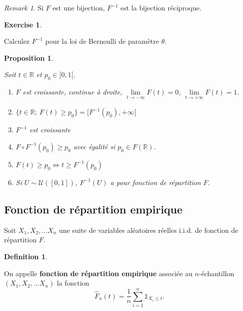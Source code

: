 \documentclass[
]{book}
\providecommand{\tightlist}{%
  \setlength{\itemsep}{0pt}\setlength{\parskip}{0pt}}
\newtheorem{proposition}{Proposition}[chapter]
\theoremstyle{definition}
\newtheorem{definition}{Definition}[chapter]
\theoremstyle{definition}
\theoremstyle{definition}
\newtheorem{exercise}{Exercise}[chapter]
\theoremstyle{definition}
\theoremstyle{remark}
\newtheorem*{remark}{Remark}
\begin{document}
\begin{remark}

Si \(F\) est une bijection, \(F^{-1}\) est la bijection réciproque.

\end{remark}

\begin{exercise}
\protect\hypertarget{exr:unlabeled-div-12}{}\label{exr:unlabeled-div-12}

Calculez \(F^{-1}\) pour la loi de Bernoulli de paramètre \(\theta\).

\end{exercise}

\begin{proposition}
\protect\hypertarget{prp:unlabeled-div-13}{}\label{prp:unlabeled-div-13}

Soit \(t\in\mathbb{R}\) et \(p_0\in]0,1[\).

\begin{enumerate}
\def\labelenumi{\arabic{enumi}.}
\tightlist
\item
  \(F\) est croissante, continue à droite, \(\underset{t\rightarrow -\infty}{\lim}F(t)=0\), \(\underset{t\rightarrow +\infty}{\lim}F(t)=1\).
\item
  \(\{t\in\mathbb{R};\ F(t)\geq p_0\} = [F^{-1}(p_0), +\infty[\)
\item
  \(F^{-1}\) est croissante
\item
  \(F\circ F^{-1}(p_0)\geq p_0\) avec égalité si \(p_0\in F(\mathbb{R})\).
\item
  \(F(t)\geq p_0 \Leftrightarrow t \geq F^{-1}(p_0)\)
\item
  Si \(U\sim\mathcal{U}([0,1])\), \(F^{-1}(U)\) a pour fonction de répartition \(F\).
\end{enumerate}

\end{proposition}

\hypertarget{fonction-de-ruxe9partition-empirique}{%
\subsection{Fonction de répartition empirique}\label{fonction-de-ruxe9partition-empirique}}

Soit \(X_1,X_2, \ldots X_n\) une suite de variables aléatoires réelles i.i.d. de fonction de répartition \(F\).

\begin{definition}
\protect\hypertarget{def:unlabeled-div-14}{}\label{def:unlabeled-div-14}

On appelle \textbf{fonction de répartition empirique} associée au \(n\)-échantillon
\((X_1,X_2, \ldots X_n)\) la fonction
\[ 
    \hat{F}_n(t)=\frac 1n \sum_{i=1}^n \mathbb{1}_{X_i \leq t}.
\]

\end{definition}
\end{document}
